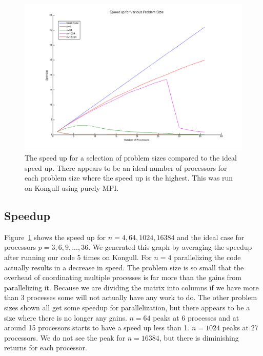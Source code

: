 \documentclass{article}
\begin{document}
	\begin{figure}[htbp]
	\begin{center}
	\includegraphics[width=15cm,keepaspectratio=true]{figs/speedup}
	\caption{The speed up for a selection of problem sizes compared to the ideal speed up. There appears to be an ideal number of processors for each problem size where the speed up is the highest. This was run on Kongull using purely MPI.}
	\label{fig:speedup}
	\end{center}
	\end{figure}

\subsection{Speedup} \label{sub:speedup}

	Figure~\ref{fig:speedup} shows the speed up for $n=4,64,1024,16384$ and the ideal case for processors $p=3,6,9,...,36$. We generated this graph by averaging the speedup after running our code 5 times on Kongull. For $n=4$ parallelizing the code actually results in a decrease in speed. The problem size is so small that the overhead of coordinating multiple processes is far more than the gains from parallelizing it. Because we are dividing the matrix into columns if we have more than 3 processes some will not actually have any work to do. The other problem sizes shown all get some speedup for parallelization, but there appears to be a size where there is no longer any gains. $n=64$ peaks at 6 processes and at around 15 processors starts to have a speed up less than 1. $n=1024$ peaks at 27 processors. We do not see the peak for $n=16384$, but there is diminishing returns for each processor.
\end{document}
